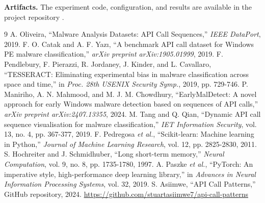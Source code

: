 \documentclass[10pt,twocolumn]{article}
\begin{document}
\noindent\textbf{Artifacts.} The experiment code, configuration, and results are available in the project repository \cite{asiimwe2024repository}.

\clearpage
\begin{thebibliography}{9}
 A. Oliveira, ``Malware Analysis Datasets: API Call Sequences,'' \emph{IEEE DataPort}, 2019.
 F. O. Catak and A. F. Yazı, ``A benchmark API call dataset for Windows PE malware classification,'' \emph{arXiv preprint arXiv:1905.01999}, 2019.
 F. Pendlebury, F. Pierazzi, R. Jordaney, J. Kinder, and L. Cavallaro, ``TESSERACT: Eliminating experimental bias in malware classification across space and time,'' in \emph{Proc. 28th USENIX Security Symp.}, 2019, pp. 729-746.
 P. Maniriho, A. N. Mahmood, and M. J. M. Chowdhury, ``EarlyMalDetect: A novel approach for early Windows malware detection based on sequences of API calls,'' \emph{arXiv preprint arXiv:2407.13355}, 2024.
 M. Tang and Q. Qian, ``Dynamic API call sequence visualisation for malware classification,'' \emph{IET Information Security}, vol. 13, no. 4, pp. 367-377, 2019.
 F. Pedregosa \emph{et al.}, ``Scikit-learn: Machine learning in Python,'' \emph{Journal of Machine Learning Research}, vol. 12, pp. 2825-2830, 2011.
 S. Hochreiter and J. Schmidhuber, ``Long short-term memory,'' \emph{Neural Computation}, vol. 9, no. 8, pp. 1735-1780, 1997.
 A. Paszke \emph{et al.}, ``PyTorch: An imperative style, high-performance deep learning library,'' in \emph{Advances in Neural Information Processing Systems}, vol. 32, 2019.
 S. Asiimwe, ``API Call Patterns,'' GitHub repository, 2024. \url{https://github.com/stuartasiimwe7/api-call-patterns}
\end{thebibliography}
\end{document}
